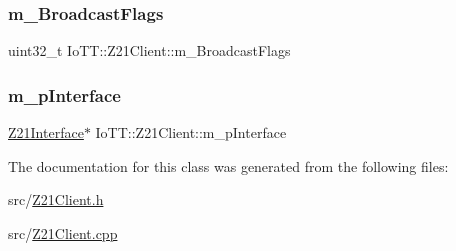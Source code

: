 \subsubsection{\texorpdfstring{m\+\_\+\+Broadcast\+Flags}{m\_BroadcastFlags}}
{\footnotesize\ttfamily uint32\+\_\+t Io\+T\+T\+::\+Z21\+Client\+::m\+\_\+\+Broadcast\+Flags\hspace{0.3cm}{\ttfamily [private]}}

\mbox{\label{classIoTT_1_1Z21Client_aead27a2871dd26028e39e22ecbd081a2}} 
\subsubsection{\texorpdfstring{m\+\_\+p\+Interface}{m\_pInterface}}
{\footnotesize\ttfamily \hyperlink{classIoTT_1_1Z21Interface}{Z21\+Interface}$\ast$ Io\+T\+T\+::\+Z21\+Client\+::m\+\_\+p\+Interface\hspace{0.3cm}{\ttfamily [private]}}



The documentation for this class was generated from the following files\+:\begin{DoxyCompactItemize}
\item 
src/\hyperlink{Z21Client_8h}{Z21\+Client.\+h}\item 
src/\hyperlink{Z21Client_8cpp}{Z21\+Client.\+cpp}\end{DoxyCompactItemize}
